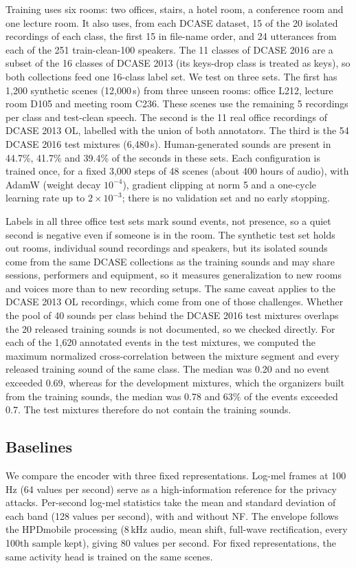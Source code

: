 \documentclass[11pt]{article}
\begin{document}
Training uses six rooms: two offices, stairs, a hotel room, a conference room and one lecture room. It also uses, from each DCASE dataset, 15 of the 20 isolated recordings of each class, the first 15 in file-name order, and 24 utterances from each of the 251 train-clean-100 speakers. The 11 classes of DCASE 2016 are a subset of the 16 classes of DCASE 2013 (its keys-drop class is treated as keys), so both collections feed one 16-class label set. We test on three sets. The first has 1,200 synthetic scenes (12,000\,s) from three unseen rooms: office L212, lecture room D105 and meeting room C236. These scenes use the remaining 5 recordings per class and test-clean speech. The second is the 11 real office recordings of DCASE 2013 OL, labelled with the union of both annotators. The third is the 54 DCASE 2016 test mixtures (6,480\,s). Human-generated sounds are present in 44.7\%, 41.7\% and 39.4\% of the seconds in these sets. Each configuration is trained once, for a fixed 3,000 steps of 48 scenes (about 400 hours of audio), with AdamW (weight decay $10^{-4}$), gradient clipping at norm 5 and a one-cycle learning rate up to $2\times10^{-3}$; there is no validation set and no early stopping.

Labels in all three office test sets mark sound events, not presence, so a quiet second is negative even if someone is in the room. The synthetic test set holds out rooms, individual sound recordings and speakers, but its isolated sounds come from the same DCASE collections as the training sounds and may share sessions, performers and equipment, so it measures generalization to new rooms and voices more than to new recording setups. The same caveat applies to the DCASE 2013 OL recordings, which come from one of those challenges. Whether the pool of 40 sounds per class behind the DCASE 2016 test mixtures overlaps the 20 released training sounds is not documented, so we checked directly. For each of the 1,620 annotated events in the test mixtures, we computed the maximum normalized cross-correlation between the mixture segment and every released training sound of the same class. The median was 0.20 and no event exceeded 0.69, whereas for the development mixtures, which the organizers built from the training sounds, the median was 0.78 and 63\% of the events exceeded 0.7. The test mixtures therefore do not contain the training sounds.

\subsection{Baselines}
We compare the encoder with three fixed representations. Log-mel frames at 100\,Hz (64 values per second) serve as a high-information reference for the privacy attacks. Per-second log-mel statistics take the mean and standard deviation of each band (128 values per second), with and without NF. The envelope follows the HPDmobile processing (8\,kHz audio, mean shift, full-wave rectification, every 100th sample kept), giving 80 values per second. For fixed representations, the same activity head is trained on the same scenes.
\end{document}
